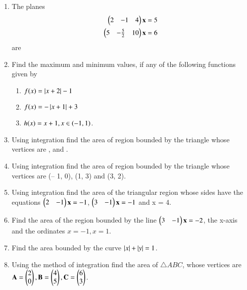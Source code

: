 \begin{enumerate}[label=\arabic*.,ref=\thesubsection.\theenumi]
\item The planes 
%
\begin{align}
\begin{pmatrix}2 & -1 & 4\end{pmatrix}\mathbf{x}&=5
\\
\begin{pmatrix}5 & -\frac{5}{2} & 10\end{pmatrix}\mathbf{x}&=6
\end{align}
%
are 
%
\begin{enumerate}[itemsep=2pt]
\end{enumerate}
%
\item Find the maximum and minimum values, if any of
the following functions given by 
%
\begin{enumerate}
\item $f(x) = \left\vert x+2\right\vert-1$
\item $f(x) = -\left\vert x+1\right\vert+3$
\item $h(x) = x+1, x \in \left(-1,1\right)$.
\end{enumerate}
%
\item Using integration find the area of region bounded by the triangle whose vertices are ,  and .
%
\item  Using integration find the area of region bounded by the triangle whose vertices are (– 1, 0), (1, 3) and (3, 2).
\item  Using integration find the area of the triangular region whose sides have the equations $\begin{pmatrix}2 & -1 \end{pmatrix}\mathbf{x} = -1$, $\begin{pmatrix}3 & -1 \end{pmatrix}\mathbf{x} = -1$ and x = 4.
%
\item Find the area of the region bounded by the line $\begin{pmatrix}3 & -1\end{pmatrix}\mathbf{x} = -2$, the x-axis and the ordinates $x = -1, x = 1$.
\item Find the area bounded by the curve $\left\vert x\right\vert+\left\vert y\right\vert = 1$.
\item Using the method of integration find the area of $\triangle ABC$, whose vertices are $\mathbf{A} = \begin{pmatrix} 2\\0 \end{pmatrix}, \mathbf{B} = \begin{pmatrix} 4\\5 \end{pmatrix}, \mathbf{C} = \begin{pmatrix} 6\\3 \end{pmatrix}$.

\end{enumerate}
